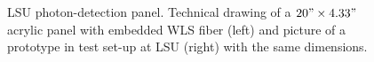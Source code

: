 \begin{figure}[htb]
\begin{center}
\caption{LSU photon-detection panel. Technical drawing of a $20"\times4.33"$ acrylic panel with embedded WLS fiber (left) and picture of a prototype in test set-up at LSU (right) with the same dimensions.}
\label{fig1-LSU} 
\end{center}
\end{figure}
%
%

